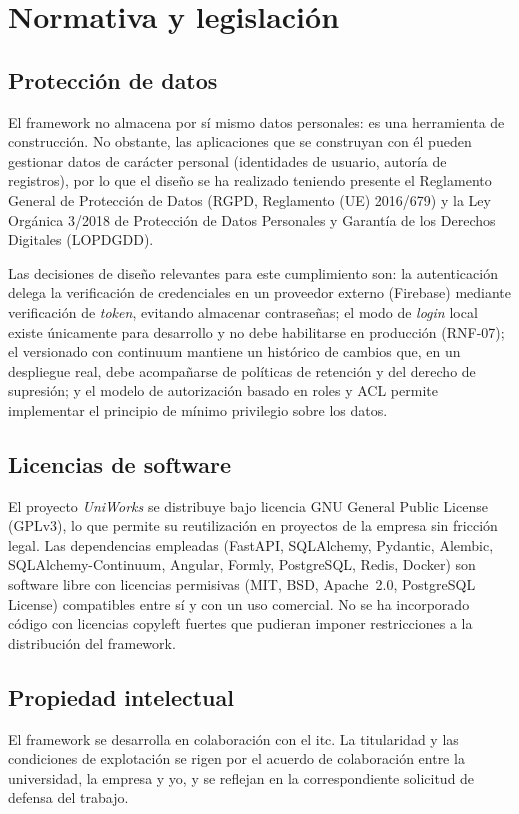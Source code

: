 \chapter{Normativa y legislación}

\section{Protección de datos}
El framework no almacena por sí mismo datos personales: es una herramienta de
construcción. No obstante, las aplicaciones que se construyan con él pueden
gestionar datos de carácter personal (identidades de usuario, autoría de
registros), por lo que el diseño se ha realizado teniendo presente el
Reglamento General de Protección de Datos (RGPD, Reglamento (UE) 2016/679) y
la Ley Orgánica 3/2018 de Protección de Datos Personales y Garantía de los
Derechos Digitales (LOPDGDD).

Las decisiones de diseño relevantes para este cumplimiento son: la
autenticación delega la verificación de credenciales en un proveedor externo
(Firebase) mediante verificación de \emph{token}, evitando almacenar
contraseñas; el modo de \emph{login} local existe únicamente para desarrollo y
no debe habilitarse en producción (RNF-07); el versionado con \gls{continuum}
mantiene un histórico de cambios que, en un despliegue real, debe acompañarse
de políticas de retención y del derecho de supresión; y el modelo de
autorización basado en roles y ACL permite implementar el principio de mínimo
privilegio sobre los datos.

\section{Licencias de software}
El proyecto \emph{UniWorks} se distribuye bajo licencia GNU General Public License (GPLv3), lo que permite su
reutilización en proyectos de la empresa sin fricción legal. Las dependencias
empleadas (FastAPI, SQLAlchemy, Pydantic, Alembic, SQLAlchemy-Continuum,
Angular, Formly, PostgreSQL, Redis, Docker) son software libre con licencias
permisivas (MIT, BSD, Apache~2.0, PostgreSQL License) compatibles entre sí y
con un uso comercial. No se ha incorporado código con licencias copyleft
fuertes que pudieran imponer restricciones a la distribución del framework.

\section{Propiedad intelectual}
El framework se desarrolla en colaboración con el \gls{itc}. La titularidad y
las condiciones de explotación se rigen por el acuerdo de colaboración entre
la universidad, la empresa y yo, y se reflejan en la
correspondiente solicitud de defensa del trabajo.
